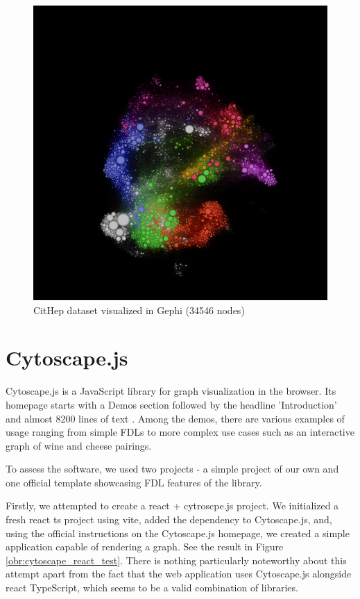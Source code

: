 \begin{figure}[p]\centering
  \includegraphics[width=140mm, keepaspectratio]{img/gephi_cithep_35k.png}
  \caption{CitHep dataset visualized in Gephi (34546 nodes)}
  \label{obr:gephi_cithep}
\end{figure}

\section{Cytoscape.js}
\label{sec:cytoscape_js}

Cytoscape.js is a JavaScript library for graph visualization in the browser.
Its homepage starts with a Demos section followed by the headline 'Introduction' and almost 8200 lines of text \cite{cytoscapes_js_homepage}.
Among the demos, there are various examples of usage ranging from simple \glspl{FDL} to more complex use cases such as an interactive graph of wine and cheese pairings.
\cite{wine_and_cheese}

To assess the software, we used two projects - a simple project of our own and one official template showcasing FDL features of the library.

Firstly, we attempted to create a react + cytroscpe.js project.
We initialized a fresh react ts project using \gls{vite}, added the dependency to Cytoscape.js, and, using the official instructions on the Cytoscape.js homepage, we
created a simple application capable of rendering a graph.
See the result in Figure \ref{obr:cytoscape_react_test}.
There is nothing particularly noteworthy about this attempt apart from the fact that the web application uses Cytoscape.js alongside react TypeScript, which seems to be a valid combination of libraries.


